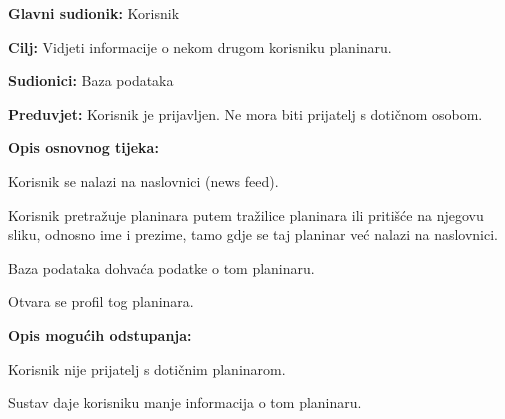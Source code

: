 			\noindent {}
			\begin{packed_item}
				
				\item \textbf{Glavni sudionik: } Korisnik
				\item  \textbf{Cilj:} Vidjeti informacije o nekom drugom korisniku planinaru.
				\item  \textbf{Sudionici:} Baza podataka
				\item  \textbf{Preduvjet:} Korisnik je prijavljen. Ne mora biti prijatelj s dotičnom osobom.
				\item  \textbf{Opis osnovnog tijeka:}
				
				\item[] \begin{packed_enum}
					
					\item Korisnik se nalazi na naslovnici (news feed).
					\item Korisnik pretražuje planinara putem tražilice planinara ili pritišće na njegovu sliku, odnosno ime i prezime, tamo gdje se taj planinar već nalazi na naslovnici.
					\item Baza podataka dohvaća podatke o tom planinaru.
					\item Otvara se profil tog planinara.
					
				\end{packed_enum}
				
				\item  \textbf{Opis mogućih odstupanja:}
				
				\item[] \begin{packed_item}
					
					\item[4.a] Korisnik nije prijatelj s dotičnim planinarom. 
					\item[] \begin{packed_enum}
						
						\item Sustav daje korisniku manje informacija o tom planinaru.
					\end{packed_enum}
						
					
				\end{packed_item}
			\end{packed_item}


